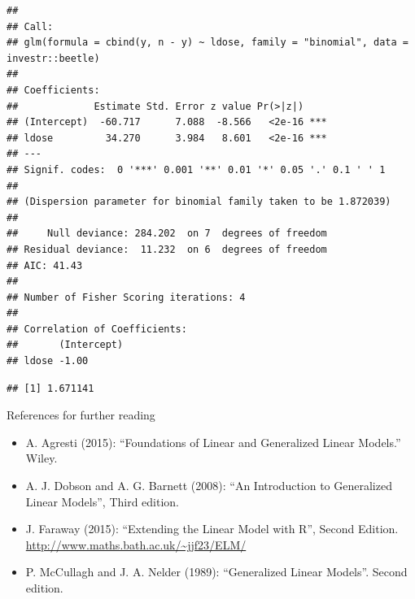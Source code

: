 \documentclass[
  ignorenonframetext,
]{beamer}
\newenvironment{Shaded}{\begin{snugshade}}{\end{snugshade}}
\newcommand{\AttributeTok}[1]{\textcolor[rgb]{0.13,0.29,0.53}{#1}}
\newcommand{\CommentTok}[1]{\textcolor[rgb]{0.56,0.35,0.01}{\textit{#1}}}
\newcommand{\FunctionTok}[1]{\textcolor[rgb]{0.13,0.29,0.53}{\textbf{#1}}}
\newcommand{\NormalTok}[1]{#1}
\newcommand{\OtherTok}[1]{\textcolor[rgb]{0.56,0.35,0.01}{#1}}
\newcommand{\SpecialCharTok}[1]{\textcolor[rgb]{0.81,0.36,0.00}{\textbf{#1}}}
\newcommand{\StringTok}[1]{\textcolor[rgb]{0.31,0.60,0.02}{#1}}
\providecommand{\tightlist}{%
  \setlength{\itemsep}{0pt}\setlength{\parskip}{0pt}}
\begin{document}
\begin{frame}[fragile]
\begin{verbatim}
## 
## Call:
## glm(formula = cbind(y, n - y) ~ ldose, family = "binomial", data = investr::beetle)
## 
## Coefficients:
##             Estimate Std. Error z value Pr(>|z|)    
## (Intercept)  -60.717      7.088  -8.566   <2e-16 ***
## ldose         34.270      3.984   8.601   <2e-16 ***
## ---
## Signif. codes:  0 '***' 0.001 '**' 0.01 '*' 0.05 '.' 0.1 ' ' 1
## 
## (Dispersion parameter for binomial family taken to be 1.872039)
## 
##     Null deviance: 284.202  on 7  degrees of freedom
## Residual deviance:  11.232  on 6  degrees of freedom
## AIC: 41.43
## 
## Number of Fisher Scoring iterations: 4
## 
## Correlation of Coefficients:
##       (Intercept)
## ldose -1.00
\end{verbatim}

\begin{Shaded}
\end{Shaded}

\begin{verbatim}
## [1] 1.671141
\end{verbatim}
\end{frame}

\begin{frame}{References for further reading}
\protect\hypertarget{references-for-further-reading}{}
\begin{itemize}
\tightlist
\item
  A. Agresti (2015): ``Foundations of Linear and Generalized Linear
  Models.'' Wiley.
\item
  A. J. Dobson and A. G. Barnett (2008): ``An Introduction to
  Generalized Linear Models'', Third edition.
\item
  J. Faraway (2015): ``Extending the Linear Model with R'', Second
  Edition. \url{http://www.maths.bath.ac.uk/~jjf23/ELM/}
\item
  P. McCullagh and J. A. Nelder (1989): ``Generalized Linear Models''.
  Second edition.
\end{itemize}
\end{frame}
\end{document}
